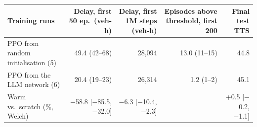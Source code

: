 \begin{tabular}{lrrrr}
\toprule
Training runs & Delay, first 50 ep.\ (veh-h) & Delay, first 1M steps (veh-h) & Episodes above threshold, first 200 & Final test TTS \\
\midrule
PPO from random initialisation (5) & 49.4 (42--68) & 28{,}094 & 13.0 (11--15) & 44.8 \\
PPO from the LLM network (6) & 20.4 (19--23) & 26{,}314 & 1.2 (1--2) & 45.1 \\
\midrule
Warm vs.\ scratch (\%, Welch) & $-$58.8 [$-$85.5, $-$32.0] & $-$6.3 [$-$10.4, $-$2.3] & & +0.5 [$-$0.2, +1.1] \\
\bottomrule
\end{tabular}
